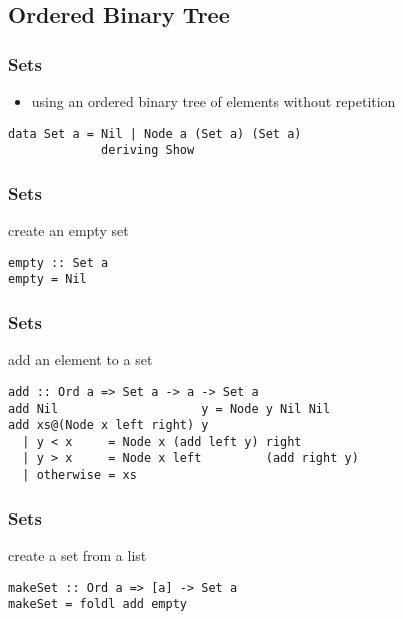 \documentclass[dvipsnames]{beamer}
\theoremstyle{plain}
\begin{document}
\subsection{Ordered Binary Tree}

\begin{frame}[fragile]
  \frametitle{Sets}

  \begin{itemize}
    \item using an ordered binary tree of elements without repetition
  \end{itemize}

  \begin{exampleblock}{}
    \begin{lstlisting}
data Set a = Nil | Node a (Set a) (Set a)
             deriving Show
    \end{lstlisting}
  \end{exampleblock}
\end{frame}

\begin{frame}[fragile]
  \frametitle{Sets}

  \begin{exampleblock}{create an empty set}
    \begin{lstlisting}
empty :: Set a
empty = Nil
    \end{lstlisting}
  \end{exampleblock}
\end{frame}

\begin{frame}[fragile]
  \frametitle{Sets}

  \begin{exampleblock}{add an element to a set}
    \begin{lstlisting}
add :: Ord a => Set a -> a -> Set a
add Nil                    y = Node y Nil Nil
add xs@(Node x left right) y
  | y < x     = Node x (add left y) right
  | y > x     = Node x left         (add right y)
  | otherwise = xs
    \end{lstlisting}
  \end{exampleblock}
\end{frame}

\begin{frame}[fragile]
  \frametitle{Sets}

  \begin{exampleblock}{create a set from a list}
    \begin{lstlisting}
makeSet :: Ord a => [a] -> Set a
makeSet = foldl add empty
    \end{lstlisting}
  \end{exampleblock}
\end{frame}
\end{document}
